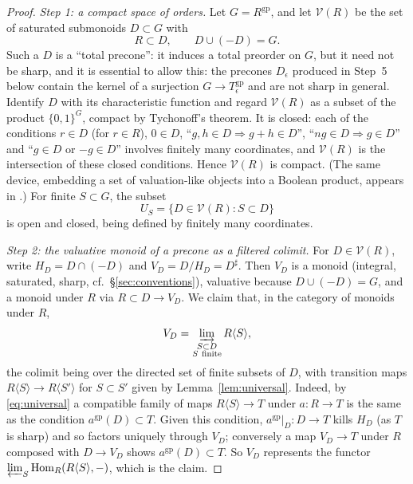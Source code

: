 \documentclass[12pt]{article}
\newcommand{\gp}{\mathrm{gp}}
\newcommand{\Hom}{\operatorname{Hom}}
\newcommand{\V}{\mathcal V}
\theoremstyle{definition}
\theoremstyle{remark}
\begin{document}
\begin{proof}
\emph{Step 1: a compact space of orders.}
Let \(G=R^{\gp}\), and let \(\V(R)\) be the set of saturated submonoids
\(D\subset G\) with
\[
                         R\subset D,\qquad D\cup(-D)=G .
\]
Such a \(D\) is a ``total precone'': it induces a total preorder on \(G\),
but it need not be sharp, and it is essential to allow this: the precones
\(D_\epsilon\) produced in Step~5 below contain the kernel of a surjection
\(G\to T_\epsilon^{\gp}\) and are not sharp in general.  Identify \(D\) with its characteristic
function and regard \(\V(R)\) as a subset of the product \(\{0,1\}^{G}\),
compact by Tychonoff's theorem.  It is closed: each of the conditions
\(r\in D\) (for \(r\in R\)), \(0\in D\), ``\(g,h\in D\Rightarrow g+h\in D\)'',
``\(ng\in D\Rightarrow g\in D\)'' and ``\(g\in D\) or \(-g\in D\)'' involves
finitely many coordinates, and \(\V(R)\) is the intersection of these closed
conditions.  Hence \(\V(R)\) is compact.  (The same device, embedding a set of
valuation-like objects into a Boolean product, appears in
\cite[Lemma~5.3.6]{CT}.)  For finite \(S\subset G\), the subset
\[
                       U_S=\{D\in\V(R):S\subset D\}
\]
is open and closed, being defined by finitely many coordinates.

\emph{Step 2: the valuative monoid of a precone as a filtered colimit.}
For \(D\in\V(R)\), write \(H_D=D\cap(-D)\) and \(V_D=D/H_D=D^\sharp\).
Then \(V_D\) is a monoid (integral, saturated, sharp, cf.\
\S\ref{sec:conventions}), valuative because \(D\cup(-D)=G\), and a monoid
under \(R\) via \(R\subset D\to V_D\).  We claim that, in the category of
monoids under \(R\),
\begin{equation}
       V_D=\varinjlim_{\substack{S\subset D\\ S\ {\rm finite}}}
                                         R\langle S\rangle,
                         \label{eq:valcolim}
\end{equation}
the colimit being over the directed set of finite subsets of \(D\), with
transition maps \(R\langle S\rangle\to R\langle S'\rangle\) for
\(S\subset S'\) given by Lemma~\ref{lem:universal}.  Indeed, by
\eqref{eq:universal} a compatible family of maps \(R\langle S\rangle\to T\)
under \(a:R\to T\) is the same as the condition \(a^{\gp}(D)\subset T\).
Given this condition, \(a^{\gp}|_D:D\to T\) kills \(H_D\) (as \(T\) is sharp)
and so factors uniquely through \(V_D\); conversely a map \(V_D\to T\) under
\(R\) composed with \(D\to V_D\) shows \(a^{\gp}(D)\subset T\).  So \(V_D\)
represents the functor \(\varprojlim_S\Hom_R(R\langle S\rangle,-)\), which is
the claim.


\end{proof}
\end{document}
